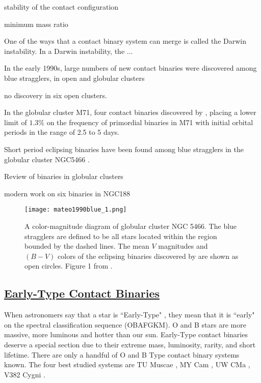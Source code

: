 \documentclass[12pt]{article} %
\numberwithin{equation}{section} %
\begin{document}
stability of the contact configuration \citep{rasio1995minimum}

minimum mass ratio \citep{arbutina2009possible} \citep{arbutina2009}

One of the ways that a contact binary system can merge is called the Darwin instability. In a Darwin instability, the ...

In the early 1990s, large numbers of new contact binaries were discovered among blue stragglers, in open and globular clusters 

\citep{kaluzny1988ccd} no discovery in six open clusters.

In the globular cluster M71, four contact binaries discovered by \citet{yan1994primordial}, placing a lower limit of $1.3\%$ on the frequency of primordial binaries in M71 with initial orbital periods in the range of 2.5 to 5 days. 

Short period eclipsing binaries have been found among blue stragglers in the globular cluster NGC5466 \citep{mateo1990blue}.

Review of binaries in globular clusters \citep{hut1992binaries}

modern work on six binaries in NGC188 \citep{chen2016physical}

\begin{figure}[H]
\centering
\texttt{[image: mateo1990blue\_1.png]}
\caption{A color-magnitude diagram of globular cluster NGC 5466. The blue stragglers are defined to be all stars located within the region bounded by the dashed lines. The mean $V$ magnitudes and $(B - V)$ colors of the eclipsing binaries discovered by \citet{mateo1990blue} are shown as open circles. Figure 1 from \citet{mateo1990blue}.}
\label{fig: mateo1990blue_1}
\end{figure}

\subsection[Early-Type Contact Binaries]{\hyperlink{to}{Early-Type Contact Binaries}}

When astronomers say that a star is ``Early-Type" , they mean that it is ``early" on the spectral classification sequence (OBAFGKM). O and B stars are more massive, more luminous and hotter than our sun. Early-Type contact binaries deserve a special section due to their extreme mass, luminosity, rarity, and short lifetime. There are only a handful of O and B Type contact binary systems known. The four best studied systems are TU Muscae \citep{penny2008tomographic}, MY Cam \citep{lorenzo2014my}, UW CMa \citep{antokhina2011light}, V382 Cygni \citep{popper1978masses}. 
\end{document}
